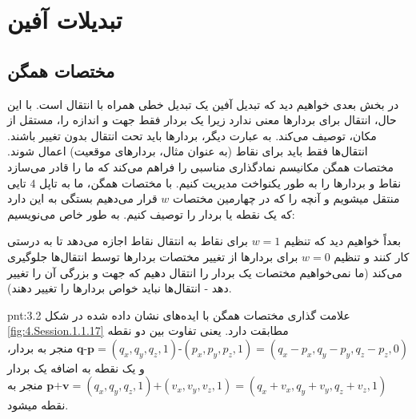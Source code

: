 \section{\textbf{تبدیلات آفین}}
\label{sec:3.2}

\subsection{\textbf{مختصات همگن}}
\label{subsec:3.2.1}
{
    \Large
    \begin{spacing}{1.5}
        در بخش بعدی خواهیم دید که تبدیل آفین یک تبدیل خطی همراه با انتقال است.
        با این حال، انتقال برای بردارها معنی ندارد زیرا یک بردار فقط جهت و اندازه را، مستقل از مکان، توصیف می‌کند.
        به عبارت دیگر، بردارها باید تحت انتقال بدون تغییر باشند.
        انتقال‌ها فقط باید برای نقاط (به عنوان مثال، بردارهای موقعیت) اعمال شوند.
        مختصات همگن مکانیسم نمادگذاری مناسبی را فراهم می‌کند که ما را قادر می‌سازد نقاط و بردارها را به طور یکنواخت مدیریت کنیم.
        با مختصات همگن، ما به تاپل $4$ تایی منتقل میشویم و آنچه را که در چهارمین مختصات $w$ قرار می‌دهیم بستگی به این دارد که یک نقطه یا بردار را توصیف کنیم.
        به طور خاص می‌نویسیم:


        بعداً خواهیم دید که تنظیم $w=1$ برای نقاط به انتقال نقاط اجازه می‌دهد تا به درستی کار کنند
        و تنظیم $w=0$  برای بردارها از تغییر مختصات بردارها توسط انتقال‌ها جلوگیری می‌کند
        (ما نمی‌خواهیم مختصات یک بردار را انتقال دهیم که جهت و بزرگی آن را تغییر دهد - انتقال‌ها نباید خواص بردارها را تغییر دهند).

        \begin{point}{pnt:3.2}
            \Large
            علامت گذاری مختصات همگن با ایده‌های نشان داده شده در شکل \ref{fig:4.Session.1.1.17} مطابقت دارد.
            یعنی تفاوت بین دو نقطه $\textbf{q-p}=(q_{x},q_{y},q_{z},1)\textbf{-}(p_{x},p_{y},p_{z},1)=(q_{x}-p_{x},q_{y}-p_{y},q_{z}-p_{z},0)$ منجر به بردار،
            و یک نقطه به اضافه یک بردار $\textbf{p+v}=(q_{x},q_{y},q_{z},1)\textbf{+}(v_{x},v_{y},v_{z},1)=(q_{x}+v_{x},q_{y}+v_{y},q_{z}+v_{z},1)$ منجر به نقطه میشود.
        \end{point}
    \end{spacing}
}

